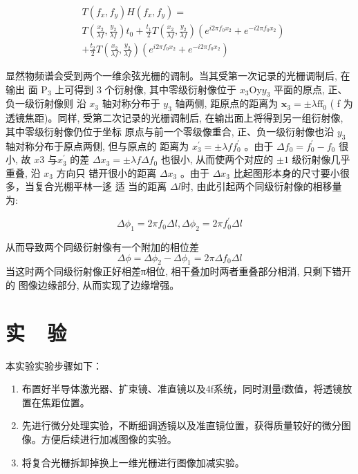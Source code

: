 \documentclass{buaaemp}
\begin{document}
\begin{align*}    
&T\left(f_{x}, f_{y}\right) H\left(f_{x}, f_{y}\right)  = \\
&T\left(\frac{x_{2}}{\lambda f}, \frac{y_{2}}{\lambda f}\right) t_{0}+\frac{t_{1}}{2} T\left(\frac{x_{2}}{\lambda f}, \frac{y_{2}}{\lambda f}\right)\left(e^{i 2 \pi f_{0} x_{2}}+e^{-i 2 \pi f_{0} x_{2}}\right) \\
&+\frac{t_{2}}{2} T\left(\frac{x_{2}}{\lambda f}, \frac{y_{2}}{\lambda f}\right)\left(e^{i 2 \pi f_{0} x_{2}}+e^{-i 2 \pi f_{0} x_{2}}\right)
\end{align*}

显然物频谱会受到两个一维余弦光栅的调制。当其受第一次记录的光栅调制后, 在输出 面  $\mathrm{P}_{3}$  上可得到 3 个衍射像, 其中零级衍射像位于 $ x_{3} \mathrm{Oy} y_{3}$  平面的原点, 正、负一级衍射像则 沿  $x_{3}$  轴对称分布于  $y_{3}$  轴两侧, 距原点的距离为  $\boldsymbol{x}_{3}=\pm \lambda \mathrm{ff}_{0}$  (  f  为透镜焦距)。同样, 受第二次记录的光栅调制后, 在输出面上将得到另一组衍射像, 其中零级衍射像仍位于坐标 原点与前一个零级像重合, 正、负一级衍射像也沿  $y_{3} $ 轴对称分布于原点两侧, 但与原点的 距离为  $x_{3}^{\prime}=\pm \lambda f f_{0}^{\prime} $ 。由于 $\Delta f_{0}=f_{0}^{\prime}-f_{0}$  很小, 故  $x 3$  与$x_{3}^{\prime}$ 的差  $\Delta x_{3}=\pm \lambda f \Delta f_{0} $ 也很小, 从而使两个对应的  $\pm 1$  级衍射像几乎重叠, 沿 $ x_{3}$  方向只 错开很小的距离  $\Delta x_{3}$  。由于  $\Delta x_{3}$  比起图形本身的尺寸要小很多，当复合光棚平林一迻 适 当的距离  $\Delta l$时, 由此引起两个同级衍射像的相移量为:

\begin{equation}
    \Delta \phi_{1}=2 \pi f_{0} \Delta l, \Delta \phi_{2}=2 \pi f_{0}^{\prime} \Delta l
\end{equation}

从而导致两个同级衍射像有一个附加的相位差
\begin{equation}
    \Delta \phi=\Delta \phi_{2}-\Delta \phi_{1}=2 \pi \Delta f_{0} \Delta l
\end{equation}
当这时两个同级衍射像正好相差π相位, 相干叠加时两者重叠部分相消, 只剩下错开的 图像边缘部分, 从而实现了边缘增强。

\section{实~~验}
本实验实验步骤如下：
\begin{enumerate}
    \item 布置好半导体激光器、扩束镜、准直镜以及4f系统，同时测量f数值，将透镜放置在焦距位置。
    \item 先进行微分处理实验，不断细调透镜以及准直镜位置，获得质量较好的微分图像。方便后续进行加减图像的实验。
    \item 将复合光栅拆卸掉换上一维光栅进行图像加减实验。
\end{enumerate}
\end{document}
